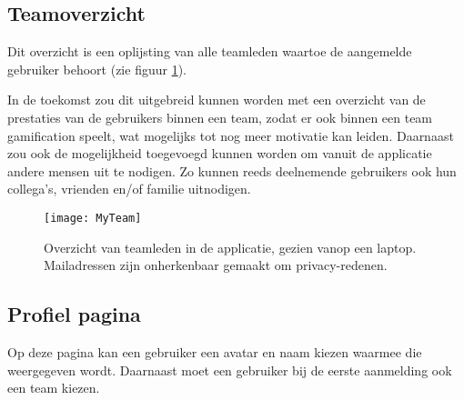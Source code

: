 \subsection{Teamoverzicht}

Dit overzicht is een oplijsting van alle teamleden waartoe de aangemelde gebruiker behoort (zie figuur \ref{fig:team}).

In de toekomst zou dit uitgebreid kunnen worden met een overzicht van de prestaties van de gebruikers binnen een team, zodat er ook binnen een team gamification speelt, wat mogelijks tot nog meer motivatie kan leiden.
Daarnaast zou ook de mogelijkheid toegevoegd kunnen worden om vanuit de applicatie andere mensen uit te nodigen. Zo kunnen reeds deelnemende gebruikers ook hun collega's, vrienden en/of familie uitnodigen.

\begin{figure}[h]
    \caption[Overzicht van teamleden]{Overzicht van teamleden in de applicatie, gezien vanop een laptop. Mailadressen zijn onherkenbaar gemaakt om privacy-redenen.}
    \texttt{[image: MyTeam]}
    \label{fig:team}
\end{figure}

\subsection{Profiel pagina}

Op deze pagina kan een gebruiker een avatar en naam kiezen waarmee die weergegeven wordt. Daarnaast moet een gebruiker bij de eerste aanmelding ook een team kiezen.